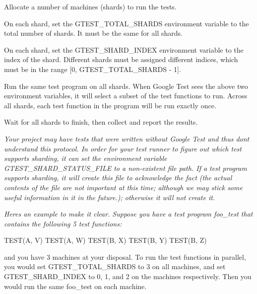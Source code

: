{\itshape 
\begin{DoxyEnumerate}
\item Allocate a number of machines (shards) to run the tests.
\end{DoxyEnumerate}
\begin{DoxyEnumerate}
\item On each shard, set the {\ttfamily G\+T\+E\+S\+T\+\_\+\+T\+O\+T\+A\+L\+\_\+\+S\+H\+A\+R\+DS} environment variable to the total number of shards. It must be the same for all shards.
\end{DoxyEnumerate}
\begin{DoxyEnumerate}
\item On each shard, set the {\ttfamily G\+T\+E\+S\+T\+\_\+\+S\+H\+A\+R\+D\+\_\+\+I\+N\+D\+EX} environment variable to the index of the shard. Different shards must be assigned different indices, which must be in the range {\ttfamily \mbox{[}0, G\+T\+E\+S\+T\+\_\+\+T\+O\+T\+A\+L\+\_\+\+S\+H\+A\+R\+DS -\/ 1\mbox{]}}.
\end{DoxyEnumerate}
\begin{DoxyEnumerate}
\item Run the same test program on all shards. When Google Test sees the above two environment variables, it will select a subset of the test functions to run. Across all shards, each test function in the program will be run exactly once.
\end{DoxyEnumerate}
\begin{DoxyEnumerate}
\item Wait for all shards to finish, then collect and report the results.
\end{DoxyEnumerate}}

{\itshape Your project may have tests that were written without Google Test and thus don\textquotesingle{}t understand this protocol. In order for your test runner to figure out which test supports sharding, it can set the environment variable {\ttfamily G\+T\+E\+S\+T\+\_\+\+S\+H\+A\+R\+D\+\_\+\+S\+T\+A\+T\+U\+S\+\_\+\+F\+I\+LE} to a non-\/existent file path. If a test program supports sharding, it will create this file to acknowledge the fact (the actual contents of the file are not important at this time; although we may stick some useful information in it in the future.); otherwise it will not create it.}

{\itshape Here\textquotesingle{}s an example to make it clear. Suppose you have a test program {\ttfamily foo\+\_\+test} that contains the following 5 test functions\+: 
\begin{DoxyCode}
TEST(A, V)
TEST(A, W)
TEST(B, X)
TEST(B, Y)
TEST(B, Z)
\end{DoxyCode}
 and you have 3 machines at your disposal. To run the test functions in parallel, you would set {\ttfamily G\+T\+E\+S\+T\+\_\+\+T\+O\+T\+A\+L\+\_\+\+S\+H\+A\+R\+DS} to 3 on all machines, and set {\ttfamily G\+T\+E\+S\+T\+\_\+\+S\+H\+A\+R\+D\+\_\+\+I\+N\+D\+EX} to 0, 1, and 2 on the machines respectively. Then you would run the same {\ttfamily foo\+\_\+test} on each machine.}

